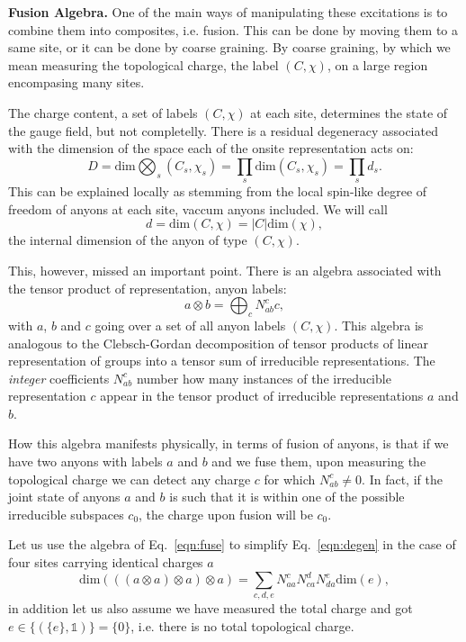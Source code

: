 \documentclass[two column]{article}
\begin{document}
\textbf{Fusion Algebra.} One of the main ways of manipulating these excitations is to combine them into composites, i.e. fusion. This can be done by moving them to a same site, or it can be done by coarse graining. By coarse graining, by which we mean measuring the topological charge, the label $(C, \chi)$, on a large region encompasing many sites.

The charge content, a set of labels $(C, \chi)$ at each site, determines the state of the gauge field, but not completelly. There is a residual degeneracy associated with the dimension of the space each of the onsite representation acts on: 
\begin{equation}
D = \text{dim}\bigotimes_s(C_s, \chi_s)=\prod_s \text{dim}(C_s, \chi_s) = \prod_s d_s. \label{eqn:degen}
\end{equation}
This can be explained locally as stemming from the local spin-like degree of freedom of anyons at each site, vaccum anyons included. We will call $$d = \text{dim}(C, \chi) = |C|\text{dim}(\chi),$$ the internal dimension of the anyon of type $(C, \chi)$.

This, however, missed an important point. There is an algebra associated with the tensor product of representation, anyon labels:
\begin{equation}
	a \otimes b = \bigoplus_{c}N^c_{ab} c,\label{eqn:fuse} 
\end{equation}
with $a$, $b$ and $c$ going over a set of all anyon labels $(C, \chi)$. This algebra is analogous to the Clebsch-Gordan decomposition of tensor products of linear representation of groups into a tensor sum of irreducible representations.
The \textit{integer} coefficients $N_{ab}^c$ number how many instances of the irreducible representation $c$ appear in the tensor product of irreducible representations $a$ and $b$.

How this algebra manifests physically, in terms of fusion of anyons, is that if we have two anyons with labels $a$ and $b$ and we fuse them, upon measuring the topological charge we can detect any charge $c$ for which $N_{ab}^c\neq 0$.
In fact, if the joint state of anyons $a$ and $b$ is such that it is within one of the possible irreducible subspaces $c_0$, the charge upon fusion will be $c_0$.

Let us use the algebra of Eq.~\eqref{eqn:fuse} to simplify Eq.~\eqref{eqn:degen} in the case of four sites carrying identical charges $a$
\begin{equation}
\text{dim}(((a\otimes a)\otimes a)\otimes a) = \sum_{c, d, e} N^c_{aa}N^d_{ca}N^e_{da}\text{dim}(e), \label{eqn:tree_bas}
\end{equation}
in addition let us also assume we have measured the total charge and got $e\in\{(\{e\}, \mathbb{1})\} = \{0\}$, i.e. there is no total topological charge.
\end{document}
